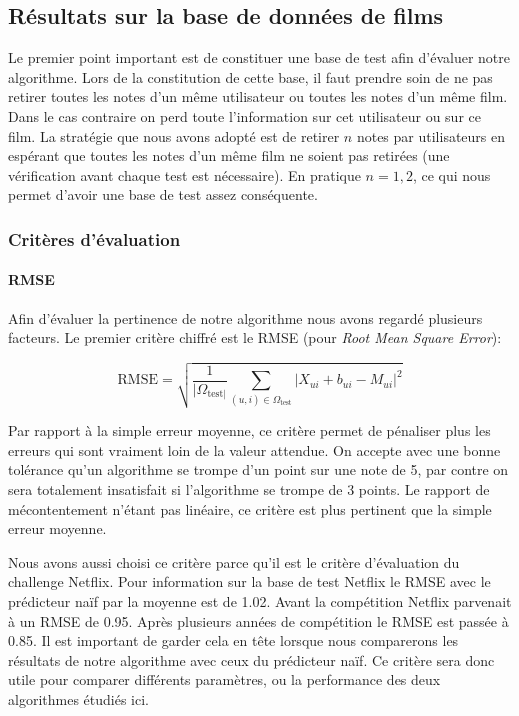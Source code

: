 \documentclass[10pt,a4paper]{article}
\begin{document}
\subsection{Résultats sur la base de données de films}

Le premier point important est de constituer une base de test afin d'évaluer notre algorithme. Lors de la constitution de cette base, il faut prendre soin de ne pas retirer toutes les notes d'un même utilisateur ou toutes les notes d'un même film. Dans le cas contraire on perd toute l'information sur cet utilisateur ou sur ce film. La stratégie que nous avons adopté est de retirer $n$ notes par utilisateurs en espérant que toutes les notes d'un même film ne soient pas retirées (une vérification avant chaque test est nécessaire). En pratique $n=1,2$, ce qui nous permet d'avoir une base de test assez conséquente.

\subsubsection*{Critères d'évaluation}

\paragraph{RMSE}

Afin d'évaluer la pertinence de notre algorithme nous avons regardé plusieurs facteurs. Le premier critère chiffré est le RMSE (pour \textit{Root Mean Square Error}):

$$ \text{RMSE} = \sqrt{\frac{1}{|\Omega_{\text{test}|}}\sum_{(u,i)\in \Omega_{\text{test}}} |X_{ui}+b_{ui}-M_{ui}|^2} $$

Par rapport à la simple erreur moyenne, ce critère permet de pénaliser plus les erreurs qui sont vraiment loin de la  valeur attendue. On accepte avec une bonne tolérance qu'un algorithme se trompe d'un point sur une note de 5, par contre on sera totalement insatisfait si l'algorithme se trompe de 3 points. Le rapport de mécontentement n'étant pas linéaire, ce critère est plus pertinent que la simple erreur moyenne.


Nous avons aussi choisi ce critère parce qu'il est le critère d'évaluation du challenge Netflix. Pour information sur la base de test Netflix le RMSE avec le prédicteur naïf par la moyenne est de 1.02. Avant la compétition Netflix parvenait à un RMSE de 0.95. Après plusieurs années de compétition le RMSE est passée à 0.85. Il est important de garder cela en tête lorsque nous comparerons les résultats de notre algorithme avec ceux du prédicteur naïf. Ce critère sera donc utile pour comparer différents paramètres, ou la performance des deux algorithmes étudiés ici. 
\end{document}
